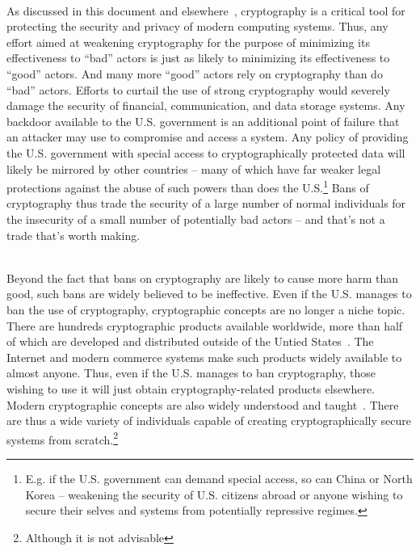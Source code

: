\begin{packed_desc}
\item[More Harm Than Good] \hfill \\ As discussed in this document and
  elsewhere~\cite{abelson2015}, cryptography is a critical tool for
  protecting the security and privacy of modern computing
  systems. Thus, any effort aimed at weakening cryptography for the
  purpose of minimizing its effectiveness to ``bad'' actors is just as
  likely to minimizing its effectiveness to ``good'' actors. And many
  more ``good'' actors rely on cryptography than do ``bad''
  actors. Efforts to curtail the use of strong cryptography would
  severely damage the security of financial, communication, and data
  storage systems. Any backdoor available to the U.S. government is an
  additional point of failure that an attacker may use to compromise
  and access a system. Any policy of providing the U.S. government
  with special access to cryptographically protected data will likely
  be mirrored by other countries -- many of which have far weaker
  legal protections against the abuse of such powers than does the
  U.S.\footnote{E.g. if the U.S. government can demand special access,
    so can China or North Korea -- weakening the security of
    U.S. citizens abroad or anyone wishing to secure their selves and
    systems from potentially repressive regimes.} Bans of cryptography
  thus trade the security of a large number of normal individuals for
  the insecurity of a small number of potentially bad actors -- and
  that's not a trade that's worth making.
\item[Ineffectiveness] \hfill \\ Beyond the fact that bans on
  cryptography are likely to cause more harm than good, such bans are
  widely believed to be ineffective. Even if the U.S. manages to ban
  the use of cryptography, cryptographic concepts are no longer a
  niche topic. There are hundreds cryptographic products available
  worldwide, more than half of which are developed and distributed
  outside of the Untied States~\cite{schneier2016}. The Internet and
  modern commerce systems make such products widely available to
  almost anyone. Thus, even if the U.S. manages to ban cryptography,
  those wishing to use it will just obtain cryptography-related
  products elsewhere. Modern cryptographic concepts are also widely
  understood and taught~\cite{schneier2010crypto}. There are thus a
  wide variety of individuals capable of creating cryptographically
  secure systems from scratch.\footnote{Although it is not advisable
}
\end{packed_desc}
